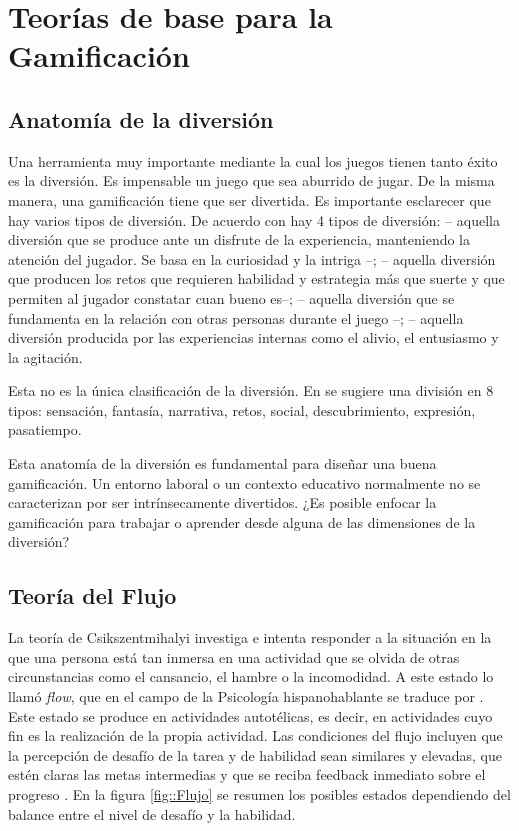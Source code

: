 \section{Teorías de base para la Gamificación}

\subsection{Anatomía de la diversión}

Una herramienta muy importante mediante la cual los juegos tienen tanto éxito es la diversión.
%
Es impensable un juego que sea aburrido de jugar.
%
De la misma manera, una gamificación tiene que ser divertida.
%
Es importante esclarecer que hay varios tipos de diversión.
%
De acuerdo con  \cite{whyweplaygames} hay 4 tipos de diversión: 
%
 -- aquella diversión que se produce ante un disfrute de la experiencia, manteniendo la atención del jugador. Se basa en la curiosidad y la intriga --;
%
\label{kindsoffun}
  -- aquella diversión que producen los retos que requieren habilidad y estrategia más que suerte y que permiten al jugador constatar cuan bueno es--;
%
 -- aquella diversión que se fundamenta en la relación con otras personas durante el juego --;
%
 -- aquella diversión producida por las experiencias internas como el alivio, el entusiasmo y la agitación.

Esta no es la única clasificación de la diversión.
%
En \cite{MDA} se sugiere una división en 8 tipos: sensación, fantasía, narrativa, retos, social, descubrimiento, expresión, pasatiempo.
%
\label{AnatomyOfFun}
%

Esta anatomía de la diversión es fundamental para diseñar una buena gamificación.
%
Un entorno laboral o un contexto educativo normalmente no se caracterizan por ser intrínsecamente divertidos.
%
¿Es posible enfocar la gamificación para trabajar o aprender desde alguna de las dimensiones de la diversión? 


\subsection{Teoría del Flujo} 

La teoría de Csikszentmihalyi investiga e intenta responder a la situación en la que una persona está tan inmersa en una actividad que se olvida de otras circunstancias como el cansancio, el hambre o la incomodidad.
%
A este estado lo llamó \textit{flow}, que en el campo de la Psicología hispanohablante se traduce por .
%
\label{autotel}
%
Este estado se produce en actividades autotélicas, es decir, en actividades cuyo fin es la realización de la propia actividad.
%
Las condiciones del flujo incluyen que la percepción de desafío de la tarea y de habilidad sean similares y elevadas, que estén claras las metas intermedias y que se reciba feedback inmediato sobre el progreso \citep{Flow}.
%
En la figura \ref{fig::Flujo} se resumen los posibles estados dependiendo del balance entre el nivel de desafío y la habilidad.

